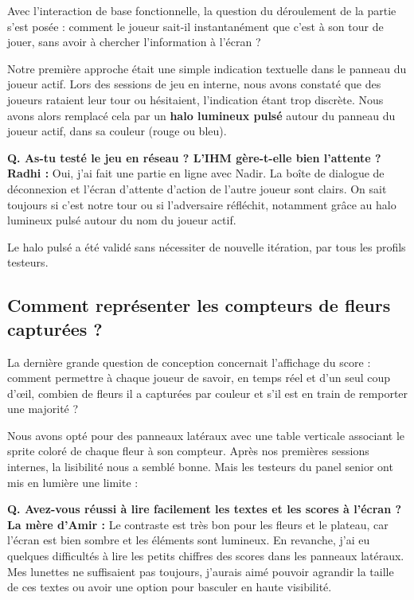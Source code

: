 \documentclass[11pt,a4paper]{article}
\begin{document}
Avec l'interaction de base fonctionnelle, la question du déroulement de la partie s'est posée : comment le joueur sait-il instantanément que c'est à son tour de jouer, sans avoir à chercher l'information à l'écran ?

Notre première approche était une simple indication textuelle dans le panneau du joueur actif. Lors des sessions de jeu en interne, nous avons constaté que des joueurs rataient leur tour ou hésitaient, l'indication étant trop discrète. Nous avons alors remplacé cela par un \textbf{halo lumineux pulsé} autour du panneau du joueur actif, dans sa couleur (rouge ou bleu).

\begin{tcolorbox}[gamerbox, title={Radhi -- 23 ans, développeur amateur et joueur de jeux de plateau}]
    \textbf{Q. As-tu testé le jeu en réseau ? L'IHM gère-t-elle bien l'attente ?}\\
    \textbf{Radhi :} Oui, j'ai fait une partie en ligne avec Nadir. La boîte de dialogue de déconnexion et l'écran d'attente d'action de l'autre joueur sont clairs. On sait toujours si c'est notre tour ou si l'adversaire réfléchit, notamment grâce au halo lumineux pulsé autour du nom du joueur actif.
\end{tcolorbox}

Le halo pulsé a été validé sans nécessiter de nouvelle itération, par tous les profils testeurs.

\subsection{Comment représenter les compteurs de fleurs capturées ?}

La dernière grande question de conception concernait l'affichage du score : comment permettre à chaque joueur de savoir, en temps réel et d'un seul coup d'œil, combien de fleurs il a capturées par couleur et s'il est en train de remporter une majorité ?

Nous avons opté pour des panneaux latéraux avec une table verticale associant le sprite coloré de chaque fleur à son compteur. Après nos premières sessions internes, la lisibilité nous a semblé bonne. Mais les testeurs du panel senior ont mis en lumière une limite :

\begin{tcolorbox}[seniorbox, title={La mère d'Amir -- 66 ans, retraitée de l'enseignement}]
    \textbf{Q. Avez-vous réussi à lire facilement les textes et les scores à l'écran ?}\\
    \textbf{La mère d'Amir :} Le contraste est très bon pour les fleurs et le plateau, car l'écran est bien sombre et les éléments sont lumineux. En revanche, j'ai eu quelques difficultés à lire les petits chiffres des scores dans les panneaux latéraux. Mes lunettes ne suffisaient pas toujours, j'aurais aimé pouvoir agrandir la taille de ces textes ou avoir une option pour basculer en haute visibilité.
\end{tcolorbox}
\end{document}
